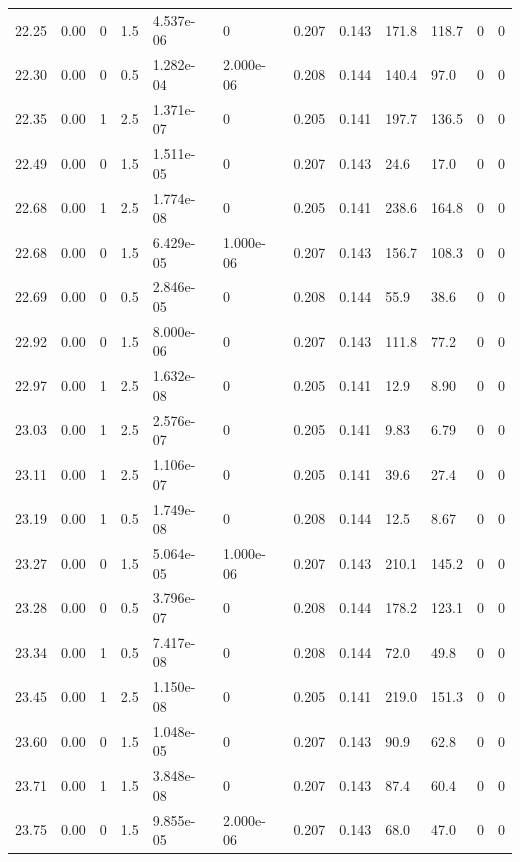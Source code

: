 \documentclass[preview]{standalone}
\begin{document}
{{{{{{{\begin{tabular}{L{1.2cm}C{1.2cm} C{0.3cm}C{0.5cm} C{1.4cm}C{1.4cm} C{1.4cm}C{1.4cm} C{1.6cm}C{1.6cm} C{1.6cm}C{1.6cm}}
  22.25  &  0.00  & 0     & 1.5 &  4.537e-06  & 0  &  0.207&   0.143& 171.8 & 118.7   &  0 & 0  \\ 
  22.30  &  0.00  & 0     & 0.5 &  1.282e-04  & 2.000e-06  &  0.208&   0.144& 140.4 & 97.0   &  0 & 0  \\ 
  22.35  &  0.00  & 1     & 2.5 &  1.371e-07  & 0  &  0.205&   0.141& 197.7 & 136.5   &  0 & 0  \\ 
  22.49  &  0.00  & 0     & 1.5 &  1.511e-05  & 0  &  0.207&   0.143& 24.6 & 17.0   &  0 & 0  \\ 
  22.68  &  0.00  & 1     & 2.5 &  1.774e-08  & 0  &  0.205&   0.141& 238.6 & 164.8   &  0 & 0  \\ 
  22.68  &  0.00  & 0     & 1.5 &  6.429e-05  & 1.000e-06  &  0.207&   0.143& 156.7 & 108.3   &  0 & 0  \\ 
  22.69  &  0.00  & 0     & 0.5 &  2.846e-05  & 0  &  0.208&   0.144& 55.9 & 38.6   &  0 & 0  \\ 
  22.92  &  0.00  & 0     & 1.5 &  8.000e-06  & 0  &  0.207&   0.143& 111.8 & 77.2   &  0 & 0  \\ 
  22.97  &  0.00  & 1     & 2.5 &  1.632e-08  & 0  &  0.205&   0.141& 12.9 & 8.90   &  0 & 0  \\ 
  23.03  &  0.00  & 1     & 2.5 &  2.576e-07  & 0  &  0.205&   0.141& 9.83 & 6.79   &  0 & 0  \\ 
  23.11  &  0.00  & 1     & 2.5 &  1.106e-07  & 0  &  0.205&   0.141& 39.6 & 27.4   &  0 & 0  \\ 
  23.19  &  0.00  & 1     & 0.5 &  1.749e-08  & 0  &  0.208&   0.144& 12.5 & 8.67   &  0 & 0  \\ 
  23.27  &  0.00  & 0     & 1.5 &  5.064e-05  & 1.000e-06  &  0.207&   0.143& 210.1 & 145.2   &  0 & 0  \\ 
  23.28  &  0.00  & 0     & 0.5 &  3.796e-07  & 0  &  0.208&   0.144& 178.2 & 123.1   &  0 & 0  \\ 
  23.34  &  0.00  & 1     & 0.5 &  7.417e-08  & 0  &  0.208&   0.144& 72.0 & 49.8   &  0 & 0  \\ 
  23.45  &  0.00  & 1     & 2.5 &  1.150e-08  & 0  &  0.205&   0.141& 219.0 & 151.3   &  0 & 0  \\ 
  23.60  &  0.00  & 0     & 1.5 &  1.048e-05  & 0  &  0.207&   0.143& 90.9 & 62.8   &  0 & 0  \\ 
  23.71  &  0.00  & 1     & 1.5 &  3.848e-08  & 0  &  0.207&   0.143& 87.4 & 60.4   &  0 & 0  \\ 
  23.75  &  0.00  & 0     & 1.5 &  9.855e-05  & 2.000e-06  &  0.207&   0.143& 68.0 & 47.0   &  0 & 0  \\ 

\end{tabular}}}}}}}}
\end{document}
